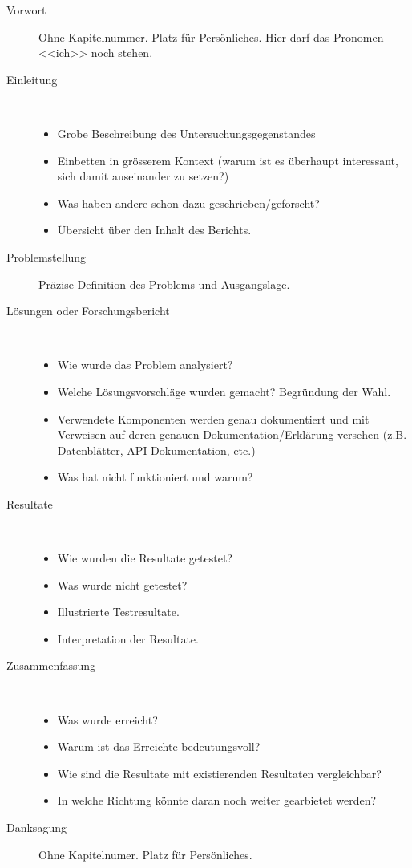 \begin{description}
  \item[Vorwort] Ohne Kapitelnummer. Platz für Persönliches. Hier darf das Pronomen
    <<ich>> noch stehen.
\item[Einleitung] \quad\\
  \begin{itemize}
  \item Grobe Beschreibung des Untersuchungsgegenstandes
  \item Einbetten in grösserem Kontext (warum ist es überhaupt
    interessant, sich damit auseinander zu setzen?)
  \item Was haben andere schon dazu geschrieben/geforscht?
  \item Übersicht über den Inhalt des Berichts.
  \end{itemize}
\item[Problemstellung] Präzise Definition des Problems und Ausgangslage.
\item[Lösungen oder Forschungsbericht] \quad \\
  \begin{itemize}
  \item Wie wurde das Problem analysiert?
  \item Welche Lösungsvorschläge wurden gemacht? Begründung der Wahl.
  \item Verwendete Komponenten werden genau dokumentiert und mit Verweisen auf
	  deren genauen Dokumentation/Erklärung versehen (z.B. Datenblätter,
		  API-Dokumentation, etc.)
  \item Was hat nicht funktioniert und warum?
  \end{itemize}
\item[Resultate] \quad \\
  \begin{itemize}
    \item Wie wurden die Resultate getestet?
    \item Was wurde nicht getestet?
    \item Illustrierte Testresultate.
    \item Interpretation der Resultate.
  \end{itemize}
\item[Zusammenfassung] \quad \\
  \begin{itemize}
  \item Was wurde erreicht?
  \item Warum ist das Erreichte bedeutungsvoll?
  \item Wie sind die Resultate mit existierenden Resultaten vergleichbar?
  \item In welche Richtung könnte daran noch weiter gearbietet werden?
  \end{itemize}
\item[Danksagung] Ohne Kapitelnumer. Platz für Persönliches.
\end{description}

